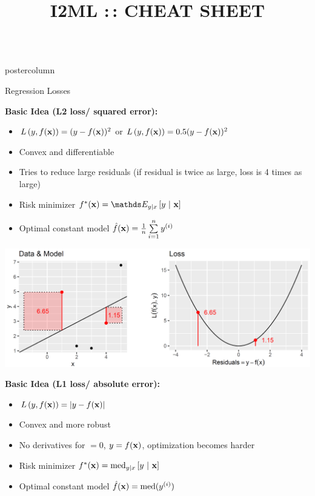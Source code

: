 \documentclass{beamer}
\title{I2ML :\,: CHEAT SHEET} %
\newlength{\columnheight} %
\begin{document}
\begin{frame}[fragile]{}
\begin{columns}
	\begin{column}{.31\textwidth}
		\begin{beamercolorbox}[center]{postercolumn}
			\begin{minipage}{.98\textwidth}
				\parbox[t][\columnheight]{\textwidth}{
					\begin{myblock}{Regression Losses}
						\begin{codebox}
			\textbf{Basic Idea (L2 loss/ squared error):}
						\end{codebox}
						
						\begin{itemize}[$\bullet$]     
						\setlength{\itemindent}{+.3in}
              \item $L\left(y, f(\mathbf{x})\right) = (y-f(\mathbf{x}))^2$ or $L\left(y, f(\mathbf{x})\right) = 0.5 (y-f(\mathbf{x}))^2$
              \item Convex and differentiable
              \item Tries to reduce large residuals (if residual is twice as large, loss is 4 times as large)   
              \item Risk minimizer $\fxbayes = \E_{y|x} \left[y ~|~ \xv \right]$
              \item Optimal constant model $\hat{f}(\mathbf{x}) = \frac{1}{n} \sum\limits_{i=1}^n y^{(i)}$
            \end{itemize}

            \vspace*{1ex}
            \includegraphics[width=0.8\columnwidth]{img/reg_loss.PNG}

\begin{codebox}
\textbf{Basic Idea (L1 loss/ absolute error):}
\end{codebox}

\begin{itemize}[$\bullet$]     \setlength{\itemindent}{+.3in}
\item $L\left(y, f(\mathbf{x})\right) = |y-f(\mathbf{x})|$
\item Convex and more robust
\item No derivatives for $ = 0$, $y = f(\mathbf{x})$, optimization becomes harder
\item Risk minimizer $f^{\ast}(\mathbf{x}) = \text{med}_{y|x} \left[y ~|~ \mathbf{x} \right]$
\item Optimal constant model $\hat{f}(\mathbf{x}) = \text{med}(y^{(i)})$    
  \end{itemize}


\end{myblock}}
\end{minipage}
\end{beamercolorbox}
\end{column}
\end{columns}
\end{frame}
\end{document}
